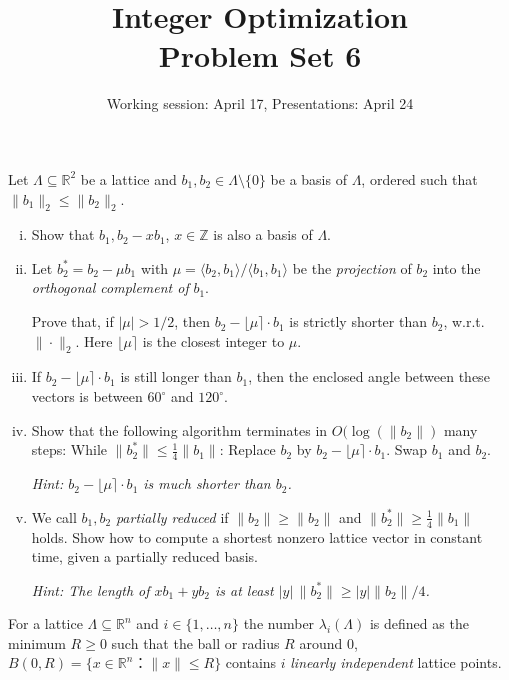 \documentclass[11pt,a4paper]{article}
\title{Integer Optimization  \\ Problem Set 6 }
\date{Working session: April 17, Presentations: April 24}
\begin{document}
\maketitle 

\noindent
Let $Λ ⊆ ℝ^2$ be a lattice and $b_1,b_2 ∈ Λ \setminus \{0\}$ be a basis of $Λ$, ordered such that $\|b_1\|_2 ≤ \|b_2\|_2$. 

\begin{enumerate}[i)]
  \item Show that $b_1, b_2 -x b_1$, $x ∈ℤ$ is also a basis of $Λ$.
  \item Let $b_2^* = b_2 - μ b_1$ with $μ = 〈b_2,b_1〉 / 〈b_1,b_1〉
    $ be the \emph{projection} of $b_2$ into the \emph{orthogonal
      complement of} $b_1$.

    Prove that, if $|μ| > 1/2$, then $b_2 - ⌊μ⌉ ⋅ b_1$ is strictly shorter than $b_2$, w.r.t. $\|⋅\|_2$. Here $⌊μ⌉$ is the closest integer to $μ$.
  \item If  $b_2 - ⌊μ⌉ ⋅ b_1$ is still longer than $b_1$, then the enclosed angle between these vectors is between $60^\circ$ and $120^\circ$.
    
  \item Show that the following algorithm terminates in $O(\log (\|b_2\|)$ many steps: 
    While $\|b_2^*\| ≤ \frac{1}{4} \|b_1\|$: Replace $b_2$  by  $b_2 - ⌊μ⌉ ⋅ b_1$. Swap $b_1$ and $b_2$.

    \hfill \emph{Hint:  $b_2 - ⌊μ⌉ ⋅ b_1$ is much shorter than $b_2$.}
  \item We call    $b_1,b_2$ \emph{partially reduced} if $\|b_2\|≥ \|b_2\|$ and  $\|b_2^*\| ≥ \frac{1}{4} \|b_1\|$ holds. Show how to compute a shortest nonzero lattice vector in constant time, given a partially reduced basis.

    \hfill \emph{Hint: The length of $x b_1 + y b_2$ is at least $|y| \, \|b_2^*\| ≥ |y| \|b_2\| /  4$.}  
    
\setcounter{carry}{\value{enumi}} 
\end{enumerate}

\noindent 
For a lattice $Λ ⊆ ℝ^n$ and $i ∈ \{1,\dots,n\}$ the number $λ_i(Λ)$ is defined as the minimum $R≥ 0$ such that the ball or radius  $R$ around $0$, $B(0,R) = \{ x ∈ ℝ^n： \|x\|≤ R\} $ contains $i$ \emph{linearly independent} lattice points.
\end{document}
